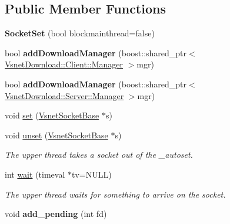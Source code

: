 \subsection*{Public Member Functions}
\begin{DoxyCompactItemize}
\item 
{\bfseries Socket\+Set} (bool blockmainthread=false)\hypertarget{classSocketSet_aef9f5b1026c5e521fb1f8c97b242da92}{}\label{classSocketSet_aef9f5b1026c5e521fb1f8c97b242da92}

\item 
bool {\bfseries add\+Download\+Manager} (boost\+::shared\+\_\+ptr$<$ \hyperlink{classVsnetDownload_1_1Client_1_1Manager}{Vsnet\+Download\+::\+Client\+::\+Manager} $>$mgr)\hypertarget{classSocketSet_a02c4926c36794e1b4574d22c31b5f839}{}\label{classSocketSet_a02c4926c36794e1b4574d22c31b5f839}

\item 
bool {\bfseries add\+Download\+Manager} (boost\+::shared\+\_\+ptr$<$ \hyperlink{classVsnetDownload_1_1Server_1_1Manager}{Vsnet\+Download\+::\+Server\+::\+Manager} $>$mgr)\hypertarget{classSocketSet_a7649a6a98bec752aaeaa5da146a12733}{}\label{classSocketSet_a7649a6a98bec752aaeaa5da146a12733}

\item 
void \hyperlink{classSocketSet_a85738f60b18c86b7e95195c45789750b}{set} (\hyperlink{classVsnetSocketBase}{Vsnet\+Socket\+Base} $\ast$s)
\item 
void \hyperlink{classSocketSet_a1b306ed68692b9d930fe0cf6c02aad86}{unset} (\hyperlink{classVsnetSocketBase}{Vsnet\+Socket\+Base} $\ast$s)\hypertarget{classSocketSet_a1b306ed68692b9d930fe0cf6c02aad86}{}\label{classSocketSet_a1b306ed68692b9d930fe0cf6c02aad86}

\begin{DoxyCompactList}\small\item\em The upper thread takes a socket out of the \+\_\+autoset. \end{DoxyCompactList}\item 
int \hyperlink{classSocketSet_abf83c4b75b0e84566bbcfcbd072d057e}{wait} (timeval $\ast$tv=N\+U\+LL)\hypertarget{classSocketSet_abf83c4b75b0e84566bbcfcbd072d057e}{}\label{classSocketSet_abf83c4b75b0e84566bbcfcbd072d057e}

\begin{DoxyCompactList}\small\item\em The upper thread waits for something to arrive on the socket. \end{DoxyCompactList}\item 
void {\bfseries add\+\_\+pending} (int fd)\hypertarget{classSocketSet_a6049f694d8aa396adab1c383b40a46c6}{}\label{classSocketSet_a6049f694d8aa396adab1c383b40a46c6}


\end{DoxyCompactItemize}
